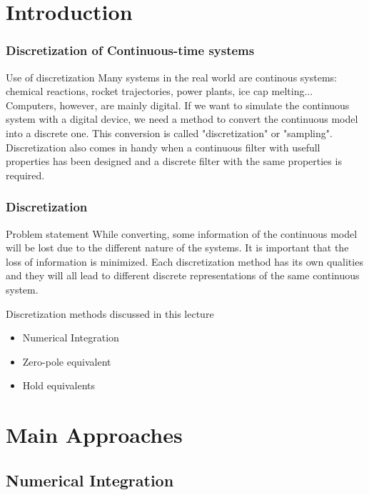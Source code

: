 \section{Introduction}

\begin{frame}
	\frametitle{Discretization of Continuous-time systems}
	\begin{block}{Use of discretization}
		Many systems in the real world are continous systems: chemical reactions, rocket trajectories, power plants, ice cap melting... Computers, however, are mainly digital. If we want to simulate the continuous system with a digital device, we need a method to convert the continuous model into a discrete one.  This conversion is called "discretization" or "sampling". Discretization also comes in handy when a continuous filter with usefull properties has been designed and a discrete filter with the same properties is required.
	\end{block}
\end{frame}

\begin{frame}
	\frametitle{Discretization}
	\begin{block}{Problem statement}
		While converting, some information of the continuous model will be lost due to the different nature of the systems. It is important that the loss of information is minimized. Each discretization method has its own qualities and they will all lead to different discrete representations of the same continuous system.
	\end{block}
	
	\begin{block}{Discretization methods discussed in this lecture}
		\begin{itemize}
			\item Numerical Integration
			\item Zero-pole equivalent
			\item Hold equivalents
		\end{itemize}
	\end{block}
\end{frame}

\section{Main Approaches}
\subsection{Numerical Integration}

